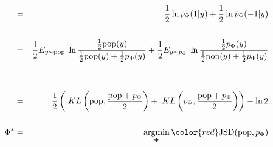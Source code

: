{

\begin{eqnarray*}
  &= & \frac{1}{2}\ln \tilde{p}_\Phi(1|y) + \frac{1}{2}\ln \tilde{p}_\Phi(-1|y) \\
  \\
  & = & \frac{1}{2} E_{y \sim \popd}\; \ln \frac{\frac{1}{2}\popd(y)}{\frac{1}{2}\popd(y) + \frac{1}{2} p_\Phi(y)} + \frac{1}{2} E_{y \sim p_\Phi}\;\ln \frac{\frac{1}{2}p_\Phi(y)}{\frac{1}{2}\popd(y) + \frac{1}{2}p_\Phi(y)} \\
\\
\\
& = & \frac{1}{2} \left(\;KL\left(\popd,\frac{\popd+p_\Phi}{2}\right)+\;KL\left(p_\Phi,\frac{\popd+p_\Phi}{2}\right)\right) - \ln 2 \\
\\
\Phi^* & = & \argmin_\Phi {\color{red} \mathrm{JSD}(\popd,p_\Phi)}
\end{eqnarray*}



}

